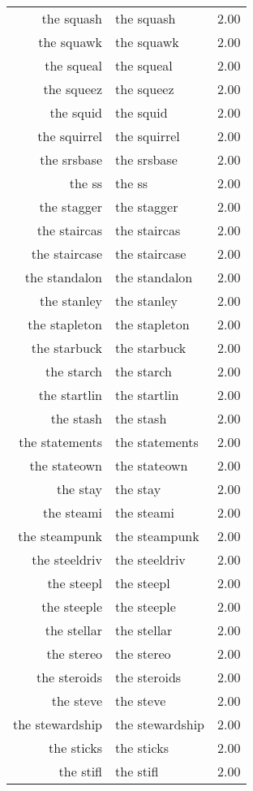 \begin{table}[ht]
\begin{tabular}{rlr}
  the squash & the squash & 2.00 \\ 
  the squawk & the squawk & 2.00 \\ 
  the squeal & the squeal & 2.00 \\ 
  the squeez & the squeez & 2.00 \\ 
  the squid & the squid & 2.00 \\ 
  the squirrel & the squirrel & 2.00 \\ 
  the srsbase & the srsbase & 2.00 \\ 
  the ss & the ss & 2.00 \\ 
  the stagger & the stagger & 2.00 \\ 
  the staircas & the staircas & 2.00 \\ 
  the staircase & the staircase & 2.00 \\ 
  the standalon & the standalon & 2.00 \\ 
  the stanley & the stanley & 2.00 \\ 
  the stapleton & the stapleton & 2.00 \\ 
  the starbuck & the starbuck & 2.00 \\ 
  the starch & the starch & 2.00 \\ 
  the startlin & the startlin & 2.00 \\ 
  the stash & the stash & 2.00 \\ 
  the statements & the statements & 2.00 \\ 
  the stateown & the stateown & 2.00 \\ 
  the stay & the stay & 2.00 \\ 
  the steami & the steami & 2.00 \\ 
  the steampunk & the steampunk & 2.00 \\ 
  the steeldriv & the steeldriv & 2.00 \\ 
  the steepl & the steepl & 2.00 \\ 
  the steeple & the steeple & 2.00 \\ 
  the stellar & the stellar & 2.00 \\ 
  the stereo & the stereo & 2.00 \\ 
  the steroids & the steroids & 2.00 \\ 
  the steve & the steve & 2.00 \\ 
  the stewardship & the stewardship & 2.00 \\ 
  the sticks & the sticks & 2.00 \\ 
  the stifl & the stifl & 2.00 \\ 

\end{tabular}
\end{table}
